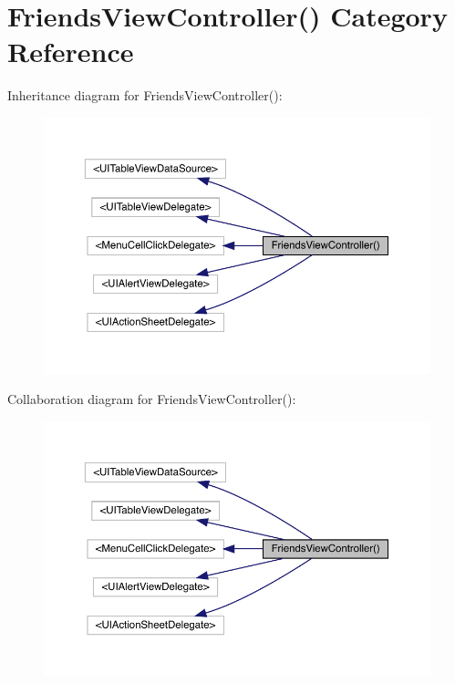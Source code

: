 \hypertarget{category_friends_view_controller_07_08}{}\section{Friends\+View\+Controller() Category Reference}
\label{category_friends_view_controller_07_08}


Inheritance diagram for Friends\+View\+Controller()\+:\nopagebreak
\begin{figure}[H]
\begin{center}
\leavevmode
\includegraphics[width=350pt]{category_friends_view_controller_07_08__inherit__graph}
\end{center}
\end{figure}


Collaboration diagram for Friends\+View\+Controller()\+:\nopagebreak
\begin{figure}[H]
\begin{center}
\leavevmode
\includegraphics[width=350pt]{category_friends_view_controller_07_08__coll__graph}
\end{center}
\end{figure}
